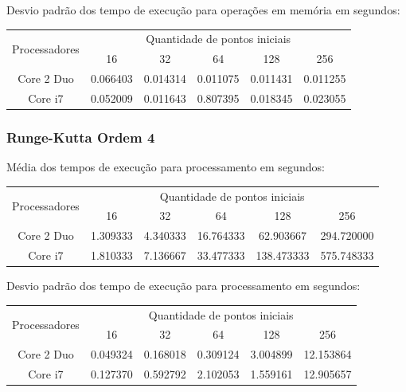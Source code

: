     \hspace{1mm}\newline
    
    \noindent Desvio padrão dos tempo de execução para operações em memória em segundos:\\
    \begin{tabular}{| c | c | c | c | c | c |}
      \hline
      \multirow{2}{*}{Processadores}& \multicolumn{5}{|c|}{Quantidade de pontos iniciais} \\ \cline{2-6}
      & 16 & 32 & 64 & 128 & 256 \\ \hline
      Core 2 Duo & 0.066403 & 0.014314 & 0.011075 & 0.011431 & 0.011255 \\ \hline
      Core i7 & 0.052009 & 0.011643 & 0.807395 & 0.018345 & 0.023055 \\ \hline

      \hline
    \end{tabular}
    
    \subsubsection{Runge-Kutta Ordem 4} 
    Média dos tempos de execução para processamento em segundos:\\
    \begin{tabular}{| c | c | c | c | c | c |}
      \hline
      \multirow{2}{*}{Processadores}& \multicolumn{5}{|c|}{Quantidade de pontos iniciais} \\ \cline{2-6}
      & 16 & 32 & 64 & 128 & 256 \\ \hline
      Core 2 Duo & 1.309333 & 4.340333 & 16.764333 & 62.903667 & 294.720000 \\ \hline
      Core i7 & 1.810333 & 7.136667 & 33.477333 & 138.473333 & 575.748333\\ \hline

      \hline
    \end{tabular}
    
    \hspace{1mm}\newline
    
    \noindent Desvio padrão dos tempo de execução para processamento em segundos:\\
    \begin{tabular}{| c | c | c | c | c | c |}
      \hline
      \multirow{2}{*}{Processadores}& \multicolumn{5}{|c|}{Quantidade de pontos iniciais} \\ \cline{2-6}
      & 16 & 32 & 64 & 128 & 256 \\ \hline
      Core 2 Duo & 0.049324 & 0.168018 & 0.309124 & 3.004899 & 12.153864 \\ \hline
      Core i7 & 0.127370 & 0.592792 & 2.102053 & 1.559161 & 12.905657 \\ \hline

      \hline
    \end{tabular}
    
